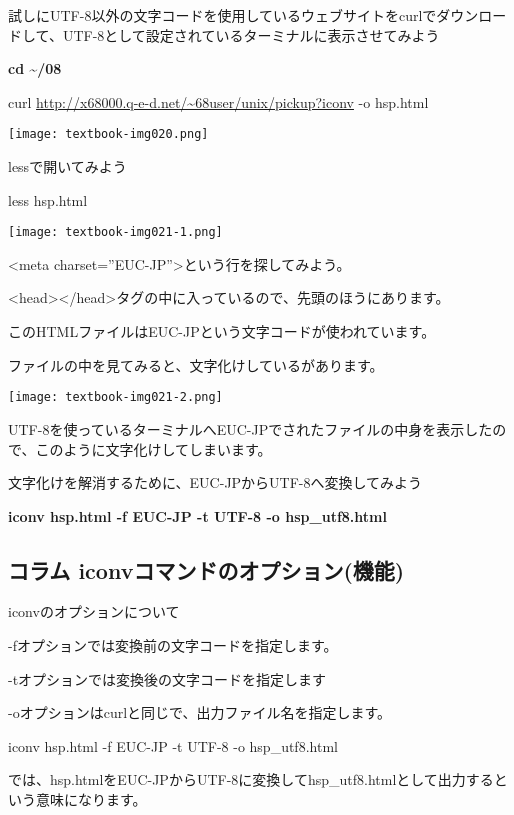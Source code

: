 試しにUTF-8以外の文字コードを使用しているウェブサイトをcurlでダウンロードして、UTF-8として設定されているターミナルに表示させてみよう

\textbf{cd {\textasciitilde}/08}

curl \url{http://x68000.q-e-d.net/~68user/unix/pickup?iconv} -o hsp.html

\begin{center}
\texttt{[image: textbook-img020.png]}

\end{center}

\bigskip

\clearpage
lessで開いてみよう

less hsp.html

\begin{center}
  \texttt{[image: textbook-img021-1.png]}
\end{center}
{\textless}meta charset=”EUC-JP”{\textgreater}という行を探してみよう。

{\textless}head{\textgreater}{\textless}/head{\textgreater}タグの中に入っているので、先頭のほうにあります。

このHTMLファイルはEUC-JPという文字コードが使われています。

ファイルの中を見てみると、文字化けしているがあります。

\begin{center}
  \texttt{[image: textbook-img021-2.png]}
\end{center}
UTF-8を使っているターミナルへEUC-JPでされたファイルの中身を表示したので、このように文字化けしてしまいます。

文字化けを解消するために、EUC-JPからUTF-8へ変換してみよう

\textbf{iconv hsp.html -f EUC-JP -t UTF-8 -o hsp\_utf8.html}

\begin{center}
\begin{boxedminipage}{17.228cm}
\section*{コラム iconvコマンドのオプション(機能)}
iconvのオプションについて

{}-fオプションでは変換前の文字コードを指定します。

{}-tオプションでは変換後の文字コードを指定します

{}-oオプションはcurlと同じで、出力ファイル名を指定します。

iconv hsp.html -f EUC-JP -t UTF-8 -o hsp\_utf8.html

では、hsp.htmlをEUC-JPからUTF-8に変換してhsp\_utf8.htmlとして出力するという意味になります。
\end{boxedminipage}
\end{center}

